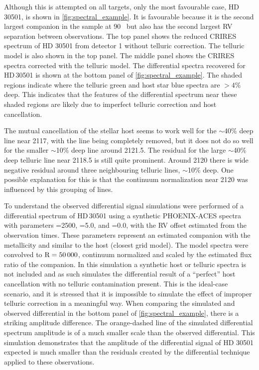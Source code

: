Although this is attempted on all targets, only the most favourable case, {HD\,30501}, is shown in \cref{fig:spectral_example}.
It is favourable because it is the second largest companion in the sample at 90~\Mjup{} but also has the second largest {RV} separation between observations.
The top panel shows the reduced CRIRES spectrum of {HD 30501} from detector 1 without telluric correction.
The telluric model is also shown in the top panel.
The middle panel shows the CRIRES spectra corrected with the telluric model.
The differential spectra recovered for {HD\,30501} is shown at the bottom panel of \cref{fig:spectral_example}.
The shaded regions indicate where the telluric {green} and host star {blue} spectra are \(> 4\%\) deep.
This indicates that the features of the differential spectrum near these shaded regions are likely due to imperfect telluric correction and host cancellation.

The mutual cancellation of the stellar host seems to work well for the \(\sim\)40\% deep line near 2117\nm{}, with the line being completely removed, but it does not do so well for the smaller \(\sim\)10\% deep line around 2121.5\nm{}.
The residual for the large \(\sim\)40\% deep telluric line near 2118.5\nm{} is still quite prominent.
Around 2120\nm{} there is wide negative residual around three neighbouring telluric lines, \(\sim\)10\% deep.
One possible explanation for this is that the continuum normalization near 2120\nm{} was influenced by this grouping of lines.

To understand the observed differential signal simulations were performed of a differential spectrum of {HD\,30501} using a synthetic {PHOENIX-ACES} spectra with parameters \Teff{}=2500\K{}, \Logg{}=5.0, and \feh{}=0.0, with the {RV} offset estimated from the observation times.
These parameters represent an estimated companion \Teff{} with the metallicity and \Logg{} similar to the host (closest grid model).
The model spectra were convolved to \(\textrm{R}=50\,000\), continuum normalized and scaled by the estimated flux ratio of the companion.
In this simulation a synthetic host or telluric spectra is not included and as such simulates the differential result of a ``perfect'' host cancellation with no telluric contamination present.
This is the ideal-case scenario, and it is stressed that it is impossible to simulate the effect of improper telluric correction in a meaningful way.
When comparing the simulated and observed differential in the bottom panel of \cref{fig:spectral_example}, there is a striking amplitude difference.
The orange-dashed line of the simulated differential spectrum amplitude is of a much smaller scale than the observed differential.
This simulation demonstrates that the amplitude of the differential signal of {HD 30501} expected is much smaller than the residuals created by the differential technique applied to these observations.

